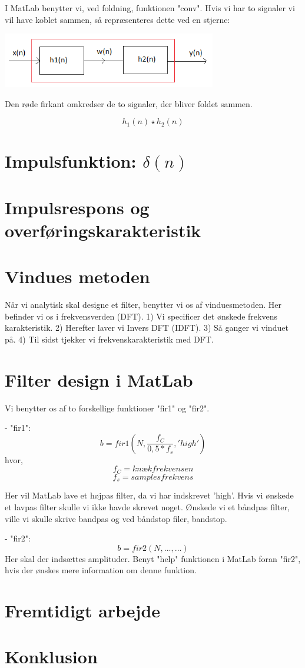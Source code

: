 \documentclass[12pt, letterpaper]{article}
\begin{document}
I MatLab benytter vi, ved foldning, funktionen "conv". 
Hvis vi har to signaler vi vil have koblet sammen, så repræsenteres dette ved en stjerne: 

\begin{center}
\includegraphics[width=0.7\textwidth]{billeder/foldning}
\end{center}

Den røde firkant omkredser de to signaler, der bliver foldet sammen. 

$$ h_1(n)\star h_2(n) $$


\section{Impulsfunktion: $\delta(n)$}

\section{Impulsrespons og overføringskarakteristik}


\section{Vindues metoden}
Når vi analytisk skal designe et filter, benytter vi os af vinduesmetoden. Her befinder vi os i frekvensverden (DFT). 
1) Vi specificer det ønskede frekvens karakteristik.
2) Herefter laver vi Invers DFT (IDFT). 
3) Så ganger vi vinduet på. 
4) Til sidst tjekker vi frekvenskarakteristik med DFT. 
 
\section{Filter design i MatLab}
Vi benytter os af to forskellige funktioner "fir1" og "fir2". 

- "fir1": 
$$ b = fir1(N, \frac{f_C}{0,5*f_s}, 'high') $$ 
hvor, 
$$ f_C = knækfrekvensen $$
$$ f_s = samplesfrekvens $$

Her vil MatLab lave et højpas filter, da vi har indskrevet 'high'. 
Hvis vi ønskede et lavpas filter skulle vi ikke havde skrevet noget. Ønskede vi et båndpas filter, ville vi skulle skrive bandpas og ved båndstop filer, bandstop. 

- "fir2": 
$$ b = fir2(N, ..., ...) $$
Her skal der indsættes amplituder. Benyt "help" funktionen i MatLab foran "fir2", hvis der ønskes mere information om denne funktion. 

\section{Fremtidigt arbejde}
 
\section{Konklusion}
\end{document}
